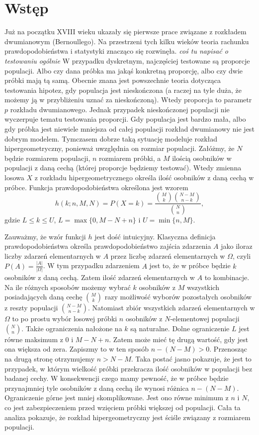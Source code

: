 \documentclass[twoside,a4paper,12pt]{book}
\begin{document}
	
\chapter*{Wstęp}
Już na początku XVIII wieku ukazały się pierwsze prace związane z rozkładem dwumianowym (Bernoullego). Na przestrzeni tych kilku wieków teoria rachunku prawdopodobieństwa i statystyki znacząco się rozwinęła. \textit{coś tu napisać o testowaniu ogólnie} W przypadku dyskretnym, najczęściej testowane są proporcje populacji. Albo czy dana próbka ma jakąś konkretną proporcję, albo czy dwie próbki mają tą samą. Obecnie znana jest powszechnie teoria dotycząca testowania hipotez, gdy populacja jest nieskończona (a raczej na tyle duża, że możemy ją w przybliżeniu uznać za nieskończoną). Wtedy proporcja to parametr $p$ rozkładu dwumianowego. Jednak przypadek nieskończonej populacji nie wyczerpuje tematu testowania proporcji. Gdy populacja jest bardzo mała, albo gdy próbka jest niewiele mniejsza od całej populacji rozkład dwumianowy nie jest dobrym modelem. Tymczasem dobrze taką sytuację modeluje rozkład hipergeometryczny, ponieważ uwzględnia on rozmiar populacji. Załóżmy, że $N$ będzie rozmiarem populacji, $n$ rozmiarem próbki, a $M$ ilością osobników w populacji z daną cechą (której proporcje będziemy testować). Wtedy zmienna losowa $X$ z rozkładu hipergeometrycznego określa ilość osobników z daną cechą w próbce. Funkcja prawdopodobieństwa określona jest wzorem
\begin{equation}
h(k;n,M,N) = P(X=k) = \frac{\binom{M}{k} \binom{N-M}{n-k}}{\binom{N}{n}},
\end{equation}
gdzie $L\leq k\leq U$, $L=\max\{0,M-N+n\}$ i $U=\min\{n,M\}$.

Zauważmy, że wzór funkcji $h$ jest dość intuicyjny. Klasyczna definicja prawdopodobieństwa określa prawdopodobieństwo zajścia zdarzenia $A$ jako iloraz liczby zdarzeń elementarnych w $A$ przez liczbę zdarzeń elementarnych w $\Omega$, czyli $P(A) = \frac{|A|}{|\Omega|}$. W tym przypadku zdarzeniem $A$ jest to, że w próbce będzie $k$ osobników z daną cechą. Zatem ilość zdarzeń elementarnych w $A$ to kombinacje. Na ile różnych sposobów możemy wybrać $k$ osobników z $M$ wszystkich posiadających daną cechę $\binom{M}{k}$ razy możliwość wyborów pozostałych osobników z reszty populacji $\binom{N-M}{n-k}$. Natomiast zbiór wszystkich zdarzeń elementarnych w $\Omega$ to po prostu wybór losowej próbki $n$ osobników z $N$-elementowej populacji $\binom{N}{n}$. Także ograniczenia nałożone na $k$ są naturalne. Dolne ograniczenie $L$ jest równe maksimum z $0$ i $M-N+n$. Zatem może mieć tę drugą wartość, gdy jest ona większa od zera. Zapiszmy to w ten sposób $n-(N-M)>0$. Przenosząc na drugą stronę otrzymujemy $n>N-M$. Taka postać jasno pokazuje, że jest to przypadek, w którym wielkość próbki przekracza ilość osobników w populacji bez badanej cechy. W konsekwencji czego mamy pewność, że w próbce będzie przynajmniej tyle osobników z daną cechą ile wynosi różnica $n-(N-M)$. Ograniczenie górne jest mniej skomplikowane. Jest ono równe minimum z $n$ i $N$, co jest zabezpieczeniem przed wzięciem próbki większej od populacji. Cała ta analiza pokazuje, że rozkład hipergeometryczny jest ściśle związany z rozmiarem populacji.
\end{document}
